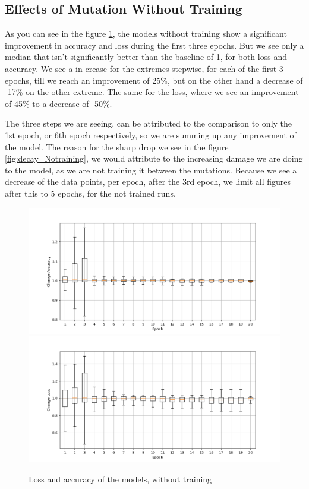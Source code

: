 \subsection{Effects of Mutation Without Training}\label{subsec:effects-of-mutation-without-training}
As you can see in the figure \ref{fig:loss-accuracy-Notraining}, the models without training show a significant improvement in accuracy and loss during the first three epochs.
But we see only a median that isn't significantly better than the baseline of 1, for both loss and accuracy.
We see a in crease for the extremes stepwise, for each of the first 3 epochs, till we reach an improvement of 25\%, but on the other hand a decrease of -17\% on the other extreme.
The same for the loss, where we see an improvement of 45\% to a decrease of -50\%.

The three steps we are seeing, can be attributed to the comparison to only the 1st epoch, or 6th epoch respectively, so we are summing up any improvement of the model.
The reason for the sharp drop we see in the figure \ref{fig:decay_Notraining}, we would attribute to the increasing damage we are doing to the model, as we are not training it between the mutations.
Because we see a decrease of the data points, per epoch, after the 3rd epoch, we limit all figures after this to 5 epochs, for the not trained runs.
\begin{figure}
    \centering
    \includegraphics[width=\textwidth]{plots/NotTrained_Change_Acc.png}
    \includegraphics[width=\textwidth]{plots/NotTrained_Change_Loss.png}
    \caption{Loss and accuracy of the models, without training}
    \label{fig:loss-accuracy-Notraining}
\end{figure}
